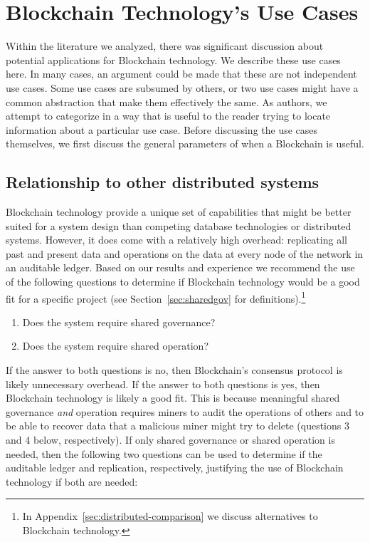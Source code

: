 
\section{Blockchain Technology's Use Cases}
\label{sec:use-cases}

Within the literature we analyzed, there was significant discussion about potential applications for Blockchain technology.
We describe these use cases here.
In many cases, an argument could be made that these are not independent use cases. Some use cases are subsumed by others, or two use cases might have a common abstraction that make them effectively the same.
As authors, we attempt to categorize in a way that is useful to the reader trying to locate information about a particular use case. Before discussing the use cases themselves, we first discuss the general parameters of when a Blockchain is useful. 

\subsection{Relationship to other distributed systems}

Blockchain technology provide a unique set of capabilities that might be better suited for a system design than competing database technologies or distributed systems.
However, it does come with a relatively high overhead: replicating all past and present data and operations on the data at every node of the network in an auditable ledger.
Based on our results and experience we recommend the use of the following questions to determine if Blockchain technology would be a good fit for a specific project (see Section~\ref{sec:sharedgov} for definitions).\footnote{In Appendix~\ref{sec:distributed-comparison} we discuss alternatives to Blockchain technology.}

\begin{enumerate}
	\item Does the system require shared governance?
	\item Does the system require shared operation?
\end{enumerate}

If the answer to both questions is no, then Blockchain's consensus protocol is likely unnecessary overhead. If the answer to both questions is yes, then Blockchain technology is likely a good fit. This is because meaningful shared governance \emph{and} operation requires miners to audit the operations of others and to be able to recover data that a malicious miner might try to delete (questions 3 and 4 below, respectively). If only shared governance or shared operation is needed, then the following two questions can be used to determine if the auditable ledger and replication, respectively, justifying the use of Blockchain technology if both are needed:

